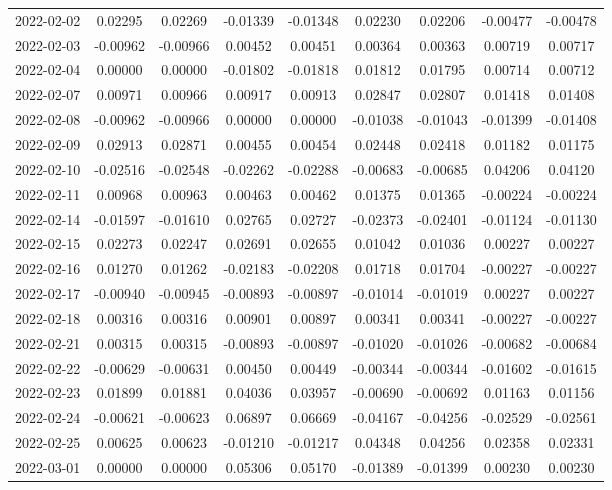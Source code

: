 \begin{footnotesize}
\begin{longtable}{lcccccccc}
2022-02-02 & 0.02295 & 0.02269 & -0.01339 & -0.01348 & 0.02230 & 0.02206 & -0.00477 & -0.00478 \\
2022-02-03 & -0.00962 & -0.00966 & 0.00452 & 0.00451 & 0.00364 & 0.00363 & 0.00719 & 0.00717 \\
2022-02-04 & 0.00000 & 0.00000 & -0.01802 & -0.01818 & 0.01812 & 0.01795 & 0.00714 & 0.00712 \\
2022-02-07 & 0.00971 & 0.00966 & 0.00917 & 0.00913 & 0.02847 & 0.02807 & 0.01418 & 0.01408 \\
2022-02-08 & -0.00962 & -0.00966 & 0.00000 & 0.00000 & -0.01038 & -0.01043 & -0.01399 & -0.01408 \\
2022-02-09 & 0.02913 & 0.02871 & 0.00455 & 0.00454 & 0.02448 & 0.02418 & 0.01182 & 0.01175 \\
2022-02-10 & -0.02516 & -0.02548 & -0.02262 & -0.02288 & -0.00683 & -0.00685 & 0.04206 & 0.04120 \\
2022-02-11 & 0.00968 & 0.00963 & 0.00463 & 0.00462 & 0.01375 & 0.01365 & -0.00224 & -0.00224 \\
2022-02-14 & -0.01597 & -0.01610 & 0.02765 & 0.02727 & -0.02373 & -0.02401 & -0.01124 & -0.01130 \\
2022-02-15 & 0.02273 & 0.02247 & 0.02691 & 0.02655 & 0.01042 & 0.01036 & 0.00227 & 0.00227 \\
2022-02-16 & 0.01270 & 0.01262 & -0.02183 & -0.02208 & 0.01718 & 0.01704 & -0.00227 & -0.00227 \\
2022-02-17 & -0.00940 & -0.00945 & -0.00893 & -0.00897 & -0.01014 & -0.01019 & 0.00227 & 0.00227 \\
2022-02-18 & 0.00316 & 0.00316 & 0.00901 & 0.00897 & 0.00341 & 0.00341 & -0.00227 & -0.00227 \\
2022-02-21 & 0.00315 & 0.00315 & -0.00893 & -0.00897 & -0.01020 & -0.01026 & -0.00682 & -0.00684 \\
2022-02-22 & -0.00629 & -0.00631 & 0.00450 & 0.00449 & -0.00344 & -0.00344 & -0.01602 & -0.01615 \\
2022-02-23 & 0.01899 & 0.01881 & 0.04036 & 0.03957 & -0.00690 & -0.00692 & 0.01163 & 0.01156 \\
2022-02-24 & -0.00621 & -0.00623 & 0.06897 & 0.06669 & -0.04167 & -0.04256 & -0.02529 & -0.02561 \\
2022-02-25 & 0.00625 & 0.00623 & -0.01210 & -0.01217 & 0.04348 & 0.04256 & 0.02358 & 0.02331 \\
2022-03-01 & 0.00000 & 0.00000 & 0.05306 & 0.05170 & -0.01389 & -0.01399 & 0.00230 & 0.00230 \\

\end{longtable}
\end{footnotesize}
